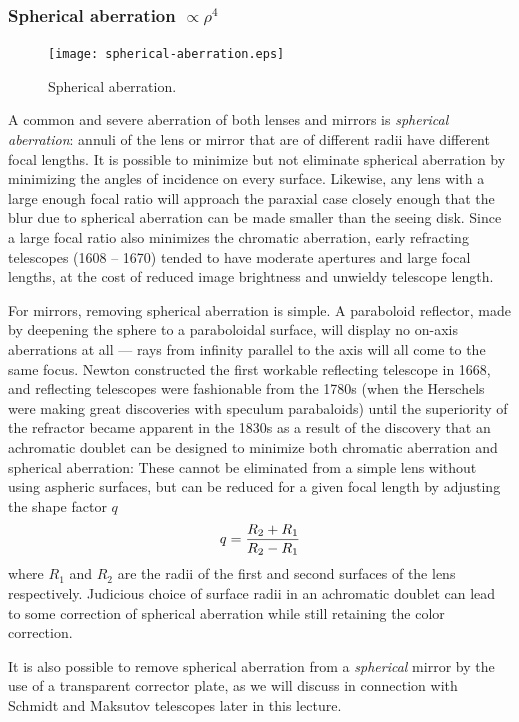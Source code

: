 \subsubsection{Spherical aberration $\propto\rho^4$}

\begin{figure}[th!]
	\centering
	\texttt{[image: spherical-aberration.eps]}
  \caption{Spherical aberration.}
  \label{fig:spherical-aberration}
\end{figure}

A common and severe aberration of both lenses and mirrors is {\it spherical 
aberration}: annuli of the lens or mirror that are of different radii have 
different focal lengths. It is possible to minimize but not eliminate spherical
aberration by minimizing the angles of incidence on every surface. Likewise,
any lens with a large enough focal ratio will approach the paraxial case closely enough
that the blur due to spherical aberration can be made smaller than the seeing disk.
Since a large focal ratio also minimizes the chromatic aberration, early refracting telescopes 
(1608 -- 1670) tended to have moderate apertures and large focal lengths, at the cost
of reduced image brightness and unwieldy telescope length.

For mirrors, removing spherical aberration is simple. A paraboloid reflector, 
made by deepening the sphere to a paraboloidal surface, 
will display no on-axis aberrations at all --- rays from infinity parallel to 
the axis will all come to the same focus. Newton constructed the first 
workable reflecting telescope in 1668, and reflecting
telescopes were fashionable from the 1780s (when the Herschels were making great
discoveries with speculum parabaloids) until the superiority of the refractor became
apparent in the 1830s as a result of the discovery that an achromatic doublet can be 
designed to minimize both chromatic aberration and spherical aberration:  
These cannot be
eliminated from a simple lens without using aspheric surfaces, but can be
reduced for a given focal length by adjusting the shape factor $q$
\[
q={R_2+R_1\over R_2-R_1}
\]
where $R_1$ and $R_2$ are the radii of the first and second surfaces 
of the lens respectively. Judicious choice of surface radii in an 
achromatic doublet can lead to some correction of spherical aberration while
still retaining the color correction. 

It is also possible to remove spherical aberration from a {\it spherical} mirror by 
the use of a transparent corrector plate, as we will discuss in connection with
Schmidt and Maksutov telescopes later in this lecture.

